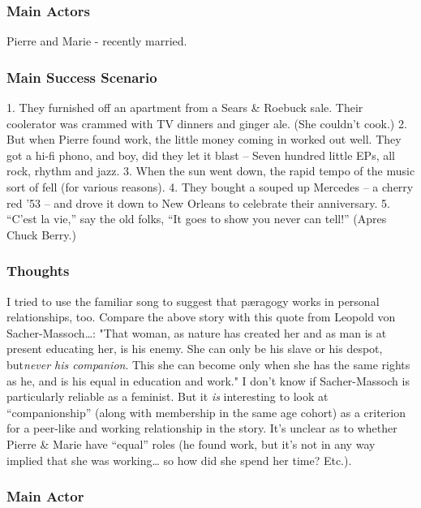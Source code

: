 \subsubsection{Main Actors}

Pierre and Marie - recently married.

\subsubsection{Main Success Scenario}

1. They furnished off an apartment from a Sears \& Roebuck sale. Their
coolerator was crammed with TV dinners and ginger ale. (She couldn't
cook.) 2. But when Pierre found work, the little money coming in worked
out well. They got a hi-fi phono, and boy, did they let it blast --
Seven hundred little EPs, all rock, rhythm and jazz. 3. When the sun
went down, the rapid tempo of the music sort of fell (for various
reasons). 4. They bought a souped up Mercedes -- a cherry red '53 -- and
drove it down to New Orleans to celebrate their anniversary. 5. ``C'est
la vie,'' say the old folks, ``It goes to show you never can tell!''
(Apres Chuck Berry.)

\subsubsection{Thoughts}

I tried to use the familiar song to suggest that pæragogy works in
personal relationships, too. Compare the above story with this quote
from Leopold von Sacher-Massoch\ldots{}: "That woman, as nature has
created her and as man is at present educating her, is his enemy. She
can only be his slave or his despot, but\emph{never his companion}. This
she can become only when she has the same rights as he, and is his equal
in education and work." I don't know if Sacher-Massoch is particularly
reliable as a feminist. But it \emph{is} interesting to look at
``companionship'' (along with membership in the same age cohort) as a
criterion for a peer-like and working relationship in the story. It's
unclear as to whether Pierre \& Marie have ``equal'' roles (he found
work, but it's not in any way implied that she was working\ldots{} so
how did she spend her time? Etc.).

\subsubsection{Main Actor}

